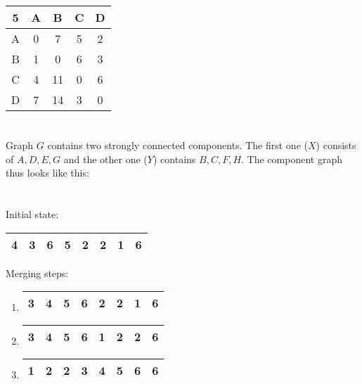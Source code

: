 \documentclass[12pt, a4paper]{article}
\begin{document}
\begin{tabular}{|c|c|c|c|c|}
	\hline
	5 & A & B & C & D\\
	\hline
	A & 0 & 7 & 5 & 2\\
	\hline
	B & 1 & 0 & 6 & 3\\
	\hline
	C & 4 & 11 & 0 & 6\\
	\hline
	D & 7 & 14 & 3 & 0\\
	\hline
\end{tabular}

\section{} %

Graph $G$ contains two strongly connected components. The first one ($X$) consists of $A, D, E, G$ and the other one ($Y$) contains $B, C, F, H$. The component graph thus looks like this:


\section{} %

Initial state:

\begin{tabular}{|c|c|c|c|c|c|c|c|}
	\hline
	4 & 3 & 6 & 5 & 2 & 2 & 1 & 6\\
	\hline
\end{tabular}

Merging steps:

\begin{enumerate}
	\item \begin{tabular}{|c|c|c|c|c|c|c|c|}
		\hline
		3 & 4 & 5 & 6 & 2 & 2 & 1 & 6\\
		\hline
	\end{tabular}
	\item \begin{tabular}{|c|c|c|c|c|c|c|c|}
		\hline
		3 & 4 & 5 & 6 & 1 & 2 & 2 & 6\\
		\hline
	\end{tabular}
	\item \begin{tabular}{|c|c|c|c|c|c|c|c|}
		\hline
		1 & 2 & 2 & 3 & 4 & 5 & 6 & 6\\
		\hline
	\end{tabular}
\end{enumerate}

\section{} %
\end{document}
